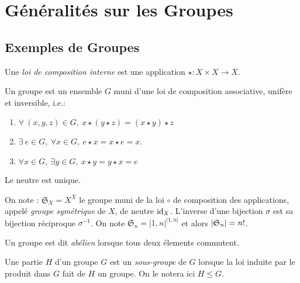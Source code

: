 \documentclass{cours}
\begin{document}
\newpage
\section{Généralités sur les Groupes}
\subsection{Exemples de Groupes}
\begin{definition}
    Une \emph{loi de composition interne} est une application $\star : X \times X \rightarrow X$.
\end{definition}
\begin{definition}[Groupe]
    Un groupe est un ensemble $G$ muni d'une loi de composition associative, unifère et inversible, i.e.:
    \begin{enumerate}
        \item $\forall \ (x, y, z) \in G, \ x \star (y \star z) = (x \star y) \star z$ 
        \item $\exists \ e \in G,\ \forall x \in G, \ e\star x = x \star e = x$.
        \item $\forall x \in G, \ \exists y \in G, \ x \star y = y \star x = e$
    \end{enumerate}
\end{definition}

\begin{remark}
    Le neutre est unique.
\end{remark}

\begin{example}
    On note : $\mathfrak{S}_{X} = X^{X}$ le groupe muni de la loi $\circ$ de composition des applications, appelé \emph{groupe symétrique} de $X$, de neutre $\textmd{id}_{X}$. L'inverse d'une bijection $\sigma$ est sa bijection réciproque $\sigma^{-1}$. On note $\mathfrak{S}_{n} = \lvert 1, n\rvert^{\lvert 1, n\rvert}$ et alors $\left|\mathfrak{S}_{n}\right| = n!$.
\end{example}

\begin{definition}
    Un groupe est dit \emph{abélien} lorsque tous deux élements commutent.
\end{definition}

\begin{definition}
    Une partie $H$ d'un groupe $G$ est un \emph{sous-groupe} de $G$ lorsque la loi induite par le produit dans $G$ fait de $H$ un groupe. On le notera ici $H \leq G$.
\end{definition}
\end{document}
